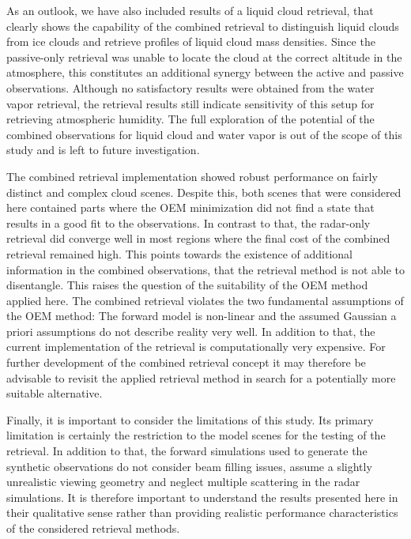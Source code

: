 \documentclass[journal abbreviation, manuscript]{copernicus}
\begin{document}
As an outlook, we have also included results of a liquid cloud retrieval, that
clearly shows the capability of the combined retrieval to distinguish liquid
clouds from ice clouds and retrieve profiles of liquid cloud mass densities.
Since the passive-only retrieval was unable to locate the cloud at the correct
altitude in the atmosphere, this constitutes an additional synergy between the
active and passive observations. Although no satisfactory results were obtained
from the water vapor retrieval, the retrieval results still indicate sensitivity
of this setup for retrieving atmospheric humidity. The full exploration of the
potential of the combined observations for liquid cloud and water vapor is out
of the scope of this study and is left to future investigation.

The combined retrieval implementation showed robust performance on fairly
distinct and complex cloud scenes. Despite this, both scenes that were
considered here contained parts where the OEM minimization did not find a state that
results in a good fit to the observations. In contrast to that, the radar-only
retrieval did converge well in most regions where the final cost of the combined
retrieval remained high. This points towards the existence of additional
information in the combined observations, that the retrieval method is not able
to disentangle. This raises the question of the suitability of the OEM method
applied here. The combined retrieval violates the two fundamental assumptions of
the OEM method: The forward model is non-linear and the assumed Gaussian a
priori assumptions do not describe reality very well. In addition to that, the
current implementation of the retrieval is computationally very expensive. For
further development of the combined retrieval concept it may therefore be
advisable to revisit the applied retrieval method in search for a potentially
more suitable alternative.

Finally, it is important to consider the limitations of this study. Its primary
limitation is certainly the restriction to the model scenes for the testing of
the retrieval. In addition to that, the forward simulations used to generate the
synthetic observations do not consider beam filling issues, assume a slightly
unrealistic viewing geometry and neglect multiple scattering in the radar
simulations. It is therefore important to understand the results presented here
in their qualitative sense rather than providing realistic performance
characteristics of the considered retrieval methods.
\end{document}
